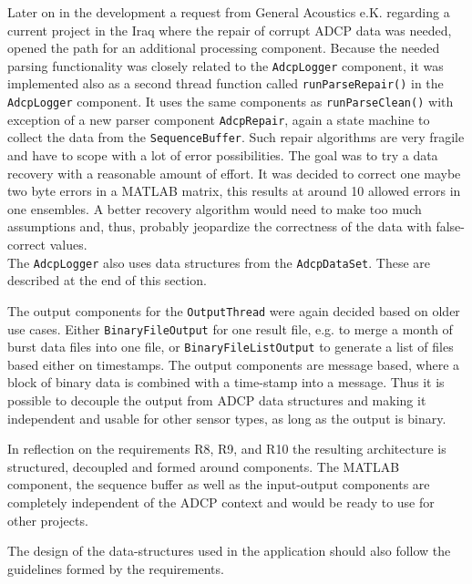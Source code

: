 Later on in the development a request from General Acoustics e.K. regarding a current project in the Iraq where the repair of corrupt ADCP data was needed, opened the path for an additional processing component. Because the needed parsing functionality was closely related to the \texttt{AdcpLogger} component, it was implemented also as a second thread function called \texttt{runParseRepair()} in the \texttt{AdcpLogger} component. It uses the same components as \texttt{runParseClean()} with exception of a new parser component \texttt{AdcpRepair}, again a state machine to collect the data from the \texttt{SequenceBuffer}. Such repair algorithms are very fragile and have to scope with a lot of error possibilities. The goal was to try a data recovery with a reasonable amount of effort. It was decided to correct one maybe two byte errors in a MATLAB matrix, this results at around 10 allowed errors in one ensembles. A better recovery algorithm would need to make too much assumptions and, thus, probably jeopardize the correctness of the data with false-correct values.\\
The \texttt{AdcpLogger} also uses data structures from the \texttt{AdcpDataSet}. These are described at the end of this section.

The output components for the \texttt{OutputThread} were again decided based on older use cases. Either \texttt{BinaryFileOutput} for one result file, e.g. to merge a month of burst data files into one file, or \texttt{BinaryFileListOutput} to generate a list of files based either on timestamps. The output components are message based, where a block of binary data is combined with a time-stamp into a message. Thus it is possible to decouple the output from ADCP data structures and making it independent and usable for other sensor types, as long as the output is binary. 

In reflection on the requirements R8, R9, and R10 the resulting architecture is structured, decoupled and formed around components. The MATLAB component, the sequence buffer as well as the input-output components are completely independent of the ADCP context and would be ready to use for other projects.

The design of the data-structures used in the application should also follow the guidelines formed by the requirements. 
\vspace{9em}

